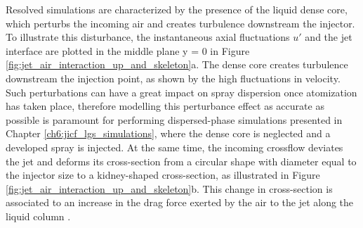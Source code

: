 Resolved simulations are characterized by the presence of the liquid dense core, which perturbs the incoming air and creates turbulence downstream the injector. To illustrate this disturbance, the instantaneous axial fluctuations $u'$ and the jet interface are plotted in the middle plane y = 0 in Figure \ref{fig:jet_air_interaction_up_and_skeleton}a. The dense core creates turbulence downstream the injection point, as shown by the high fluctuations in velocity. Such perturbations can have a great impact on spray dispersion once atomization has taken place, therefore modelling this perturbance effect as accurate as possible is paramount for performing dispersed-phase simulations presented in Chapter \ref{ch6:jicf_lgs_simulations}, where the dense core is neglected and a developed spray is injected. At the same time, the incoming crossflow deviates the jet and deforms its cross-section from a circular shape with diameter equal to the injector size to a kidney-shaped cross-section, as illustrated in Figure \ref{fig:jet_air_interaction_up_and_skeleton}b. This change in cross-section is associated to an increase in the drag force exerted by the air to the jet along the liquid column .

%



